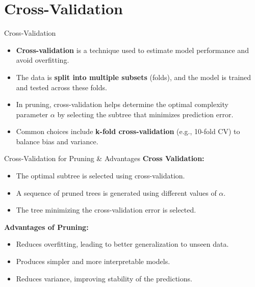 \documentclass[aspectratio=169,xcolor=dvipsnames]{beamer}
\begin{document}
\section{Cross-Validation}
\begin{frame}{Cross-Validation}
    \begin{itemize}
        \item \textbf{Cross-validation} is a technique used to estimate model performance and avoid overfitting.
        \item The data is \textbf{split into multiple subsets} (folds), and the model is trained and tested across these folds.
        \item In pruning, cross-validation helps determine the optimal complexity parameter \( \alpha \) by selecting the subtree that minimizes prediction error.
        \item Common choices include \textbf{k-fold cross-validation} (e.g., 10-fold CV) to balance bias and variance.
    \end{itemize}
\end{frame}


\begin{frame}{Cross-Validation for Pruning \& Advantages}
\textbf{Cross Validation:}
    \begin{itemize}
        \item The optimal subtree is selected using cross-validation.
        \item A sequence of pruned trees is generated using different values of \( \alpha \).
        \item The tree minimizing the cross-validation error is selected.
    \end{itemize}
\textbf{Advantages of Pruning:}
    \begin{itemize}
        \item Reduces overfitting, leading to better generalization to unseen data.
        \item Produces simpler and more interpretable models.
        \item Reduces variance, improving stability of the predictions.
    \end{itemize}
\end{frame}
\end{document}
